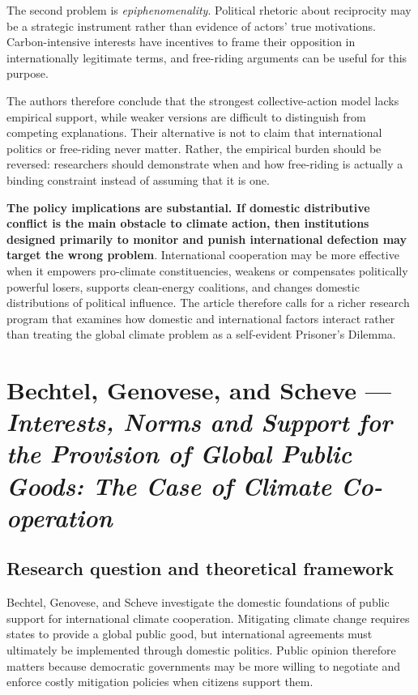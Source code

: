 The second problem is \textit{epiphenomenality}. Political rhetoric about reciprocity may be a strategic instrument rather than evidence of actors' true motivations. Carbon-intensive interests have incentives to frame their opposition in internationally legitimate terms, and free-riding arguments can be useful for this purpose.

The authors therefore conclude that the strongest collective-action model lacks empirical support, while weaker versions are difficult to distinguish from competing explanations. Their alternative is not to claim that international politics or free-riding never matter. Rather, the empirical burden should be reversed: researchers should demonstrate when and how free-riding is actually a binding constraint instead of assuming that it is one.

\textbf{The policy implications are substantial. If domestic distributive conflict is the main obstacle to climate action, then institutions designed primarily to monitor and punish international defection may target the wrong problem}. International cooperation may be more effective when it empowers pro-climate constituencies, weakens or compensates politically powerful losers, supports clean-energy coalitions, and changes domestic distributions of political influence. The article therefore calls for a richer research program that examines how domestic and international factors interact rather than treating the global climate problem as a self-evident Prisoner's Dilemma.


\clearpage
\section{Bechtel, Genovese, and Scheve --- \textit{Interests, Norms and Support for the Provision of Global Public Goods: The Case of Climate Co-operation}}

\subsection{Research question and theoretical framework}

Bechtel, Genovese, and Scheve investigate the domestic foundations of public support for international climate cooperation. Mitigating climate change requires states to provide a global public good, but international agreements must ultimately be implemented through domestic politics. Public opinion therefore matters because democratic governments may be more willing to negotiate and enforce costly mitigation policies when citizens support them.

